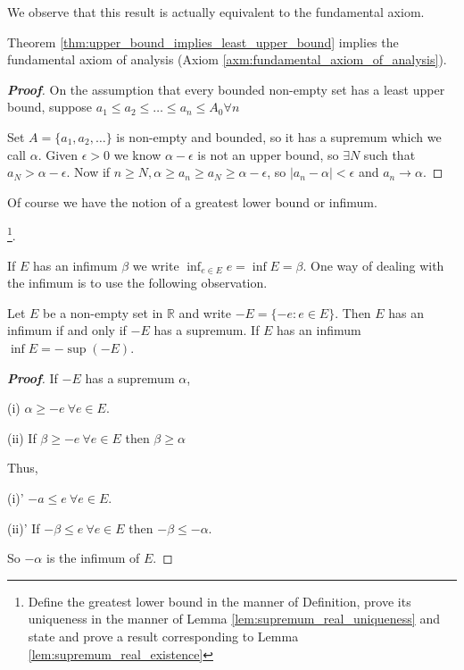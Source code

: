 We observe that this result is actually equivalent to the fundamental axiom.

\begin{theorem}\label{thm:least_upper_bound_existence_implies_fundamental_axiom_of_analysis}
Theorem \ref{thm:upper_bound_implies_least_upper_bound} implies the fundamental axiom of analysis (Axiom \ref{axm:fundamental_axiom_of_analysis}).
\end{theorem}

\begin{proof}[\bf Proof]
On the assumption that every bounded non-empty set has a least upper bound, suppose $a_1 \leq a_2 \leq \ldots \leq a_n \leq A_0 \forall n$

Set $A = \{a_1, a_2, \ldots \}$ is non-empty and bounded, so it has a supremum which we call $\alpha$. Given $\epsilon > 0$ we know $\alpha - \epsilon$ is not an upper bound, so $\exists N$ such that $a_N > \alpha - \epsilon$. Now if $n \geq N, \alpha \geq a_n \geq a_N \geq \alpha - \epsilon$, so $|a_n - \alpha| < \epsilon$ and $a_n \rightarrow \alpha$.
\end{proof}


Of course we have the notion of a greatest lower bound or infimum.

\begin{definition}\label{def:infimum_real}
\footnote{Define the greatest lower bound in the manner of Definition, prove its uniqueness in the manner of Lemma \ref{lem:supremum_real_uniqueness} and state and prove a result corresponding to Lemma \ref{lem:supremum_real_existence}}.
\end{definition}

If $E$ has an infimum $\beta$ we write $\inf_{e \in E} e = \inf E = \beta$. One way of dealing with the infimum is to use the following observation.

\begin{lemma}\label{lem:negative_infimum}
Let $E$ be a non-empty set in $\mathbb{R}$ and write $-E=\{-e : e \in E\}$. Then $E$ has an infimum if and only if $-E$ has a supremum. If $E$ has an infimum $\inf E = -\sup (-E)$.
\end{lemma}

\begin{proof}[\bf Proof]
If $-E$ has a supremum $\alpha$,
\ben
\item [(i)] $\alpha \geq -e \ \forall e \in E$.
\item [(ii)] If $\beta \geq -e \ \forall e \in E$ then $\beta \geq \alpha$
\een

Thus,
\ben
\item [(i)'] $-a \leq e \ \forall e \in E$.
\item [(ii)'] If $-\beta \leq e \ \forall e \in E$ then $-\beta \leq -\alpha$.
\een

So $-\alpha$ is the infimum of $E$.
\end{proof}

